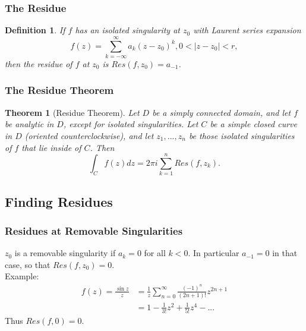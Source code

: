 \documentclass{article}
\newtheorem{theorem}{Theorem}[section]
\newtheorem{definition}{Definition}[section]
\begin{document}
\subsubsection{The Residue}
\begin{definition}
If $f$ has an isolated singularity at $z_0$ with Laurent series expansion
\begin{equation*}
f(z) = \sum_{k=-\infty}^{\infty}a_k(z - z_0)^k, 0 < \left|z - z_0\right| < r,
\end{equation*}
then the residue of $f$ at $z_0$ is $Res(f, z_0) = a_{-1}$.
\end{definition}

\subsubsection{The Residue Theorem}
\begin{theorem}[Residue Theorem]
Let $D$ be a simply connected domain, and let $f$ be analytic in $D$, except for isolated singularities. Let $C$ be a simple closed curve in $D$ (oriented counterclockwise), and let $z_1, ... , z_n$ be those isolated singularities of $f$ that lie inside of $C$. Then
\begin{equation*}
\int_{C}f(z)dz = 2\pi i \sum_{k=1}^n Res(f, z_k).
\end{equation*}
\end{theorem}

\subsection{Finding Residues}

\subsubsection{Residues at Removable Singularities}
$z_0$ is a removable singularity if $a_k = 0$ for all $k < 0$. In particular $a_{-1} = 0$ in that case, so that $Res(f, z_0) = 0$. \\
Example: 
\begin{align*}
f(z) = \frac{\sin z}{z} &= \frac{1}{z} \sum_{n=0}^{\infty} \frac{(-1)^n}{(2n + 1)!}z^{2n + 1} \\
&= 1 - \frac{1}{3!}z^2 + \frac{1}{5!}z^4 - ...
\end{align*}
Thus $Res(f, 0) = 0$.
\end{document}
